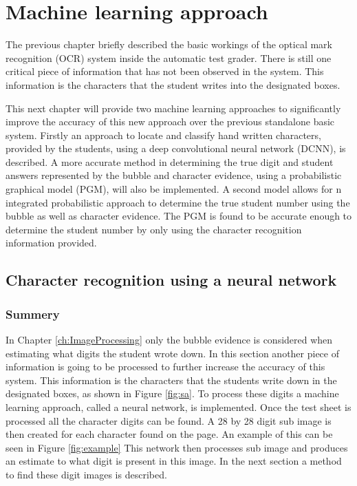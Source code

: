 \chapter{Machine learning approach}
\label{ch:MachineLearning}
\graphicspath{{Chapter4/Chapter4Figures/}}
The previous chapter briefly described the basic workings of the optical mark recognition (OCR) system inside the automatic test grader. There is still one critical piece of information that has not been observed in the system. This information is the characters that the student writes into the designated boxes.

This next chapter will provide two machine learning approaches to significantly improve the accuracy of this new approach over the previous standalone basic system. Firstly an approach to locate and classify hand written characters, provided by the students, using a deep convolutional neural network (DCNN), is described. A more accurate method in determining the true digit and student answers represented by the bubble and character evidence, using a probabilistic  graphical model (PGM), will also be implemented. A second model allows for n integrated probabilistic approach to determine the true student number using the bubble as well as character evidence. The PGM is found to be accurate enough to determine the student number by only using the character recognition information provided.

\section{Character recognition using a neural network}

\subsection{Summery}

In Chapter \ref{ch:ImageProcessing} only the bubble evidence is considered when estimating what digits the student wrote down. In this section another piece of information is going to be processed to further increase the accuracy of this system. This information is the characters that the students write down in the designated boxes, as shown in Figure \ref{fig:sa}. To process these digits a machine learning approach, called a neural network, is implemented. Once the test sheet is processed all the character digits can be found. A 28 by 28 digit sub image is then created for each character found on the page. An example of this can be seen in Figure \ref{fig:example} This network then processes sub image and produces an estimate to what digit is present in this image. In the next section a method to find these digit images is described.

